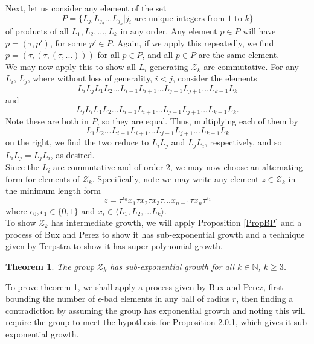 \documentclass[11pt]{amsart}
\newtheorem{theorem}{Theorem}[section]
\theoremstyle{definition}
\theoremstyle{remark}
\numberwithin{equation}{section}
\begin{document}
\indent Next, let us consider any element of the set
$$P=\{L_{j_1}L_{j_2}...L_{j_k}| j_i \textrm{ are unique integers from 1 to } k\}$$
of products of all $L_1,L_2,...,L_k$ in any order. Any element $p\in P$ will have $p=(\tau,p')$, for some $p'\in P$. Again, if we apply this repeatedly, we find $p=(\tau,(\tau,(\tau,...)))$ for all $p\in P$, and all $p\in P$ are the same element.\\

\indent We may now apply this to show all $L_i$ generating $\mathcal{Z}_k$ are commutative. For any $L_i$, $L_j$, where without loss of generality, $i<j$,  consider the elements $$L_iL_jL_1L_2...L_{i-1}L_{i+1}...L_{j-1}L_{j+1}...L_{k-1}L_k$$ and $$L_jL_iL_1L_2...L_{i-1}L_{i+1}...L_{j-1}L_{j+1}...L_{k-1}L_k.$$ Note these are both in $P$, so they are equal. Thus, multiplying each of them by $$L_1L_2...L_{i-1}L_{i+1}...L_{j-1}L_{j+1}...L_{k-1}L_k$$ on the right, we find the two reduce to $L_iL_j$ and $L_jL_i$, respectively, and so $L_iL_j=L_jL_i$, as desired.\\


\indent Since the $L_i$ are commutative and of order 2, we may now choose an alternating form for elements of $\mathcal{Z}_k$. Specifically, note we may write any element $z\in \mathcal{Z}_k$ in the minimum length form { $$ z=\tau^{\epsilon_0}x_1\tau x_2\tau x_3\tau \ldots x_{n-1}\tau x_n \tau^{\epsilon_1}$$}
where $\epsilon_0,\epsilon_1\in \{0,1\}$ and $x_i\in \langle L_1,L_2,...L_k\rangle$.\\




\indent To show $\mathcal{Z}_k$ has intermediate growth, we will apply Proposition \ref{PropBP} and a process of Bux and Perez to show it has sub-exponential growth and a technique given by Terpstra to show it has super-polynomial growth.\\



\begin{theorem} \label{ZkExp}
The group $\mathcal{Z}_k$ has sub-exponential growth for all $k\in \mathbb{N}$, $k\geq 3$.\\
\end{theorem}


\indent To prove theorem \ref{ZkExp}, we shall apply a process given by Bux and Perez, first bounding the number of $\epsilon$-bad elements in any ball of radius $r$, then finding a contradiction by assuming the group has exponential growth and noting this will require the group to meet the hypothesis for Proposition 2.0.1, which gives it sub-exponential growth.
\end{document}
